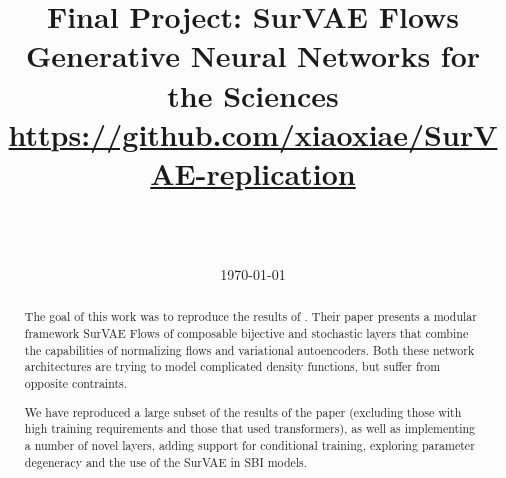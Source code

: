 \documentclass{article}
\title{\bf Final Project: SurVAE Flows \\ \Large Generative Neural Networks for the Sciences \\[1.5em] \large \url{https://github.com/xiaoxiae/SurVAE-replication}}
\author{
\makebox[10em][r]{\textit{Jannis Heising}}\hspace{1em}\makebox[10em][l]{[4028349]} \\
\makebox[10em][r]{\textit{Tomáš Sláma}}\hspace{1em}\makebox[10em][l]{[3768224]} \\
\makebox[10em][r]{\textit{Maria Stickel}}\hspace{1em}\makebox[10em][l]{[4040125]}
}
\date{\today}
\theoremstyle{definition}
\begin{document}
\maketitle
\thispagestyle{empty}

\newpage

{\small \tableofcontents}

\newpage

\begin{abstract}

The goal of this work was to reproduce the results of \cite{nielsen2020survae}. Their paper presents a modular framework SurVAE Flows of composable bijective and stochastic layers that combine the capabilities of normalizing flows and variational autoencoders. Both these network architectures are trying to model complicated density functions, but suffer from opposite contraints. 

We have reproduced a large subset of the results of the paper (excluding those with high training requirements and those that used transformers), as well as implementing a number of novel layers, adding support for conditional training, exploring parameter degeneracy and the use of the SurVAE in SBI models.
\end{abstract}

\newpage







\newpage

\nocite{*}
\printbibliography[heading=bibintoc,title={Bibliography}]
\end{document}
